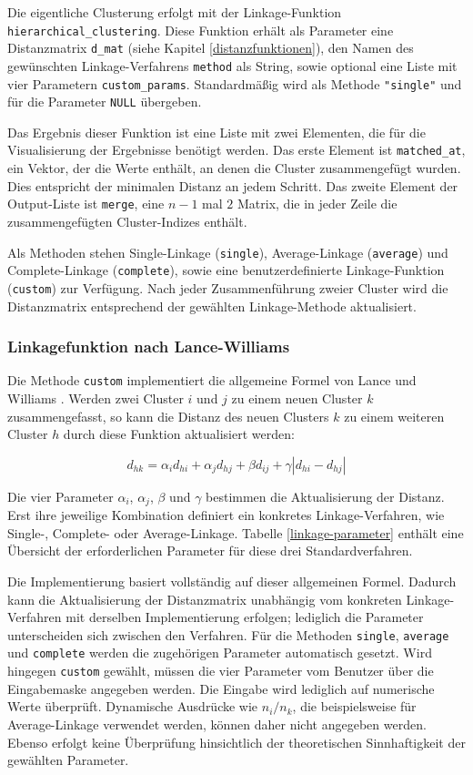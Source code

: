 \documentclass[12pt]{article}
\begin{document}
Die eigentliche Clusterung erfolgt mit der Linkage-Funktion \verb*|hierarchical_clustering|. Diese Funktion erhält als Parameter eine Distanzmatrix \verb*|d_mat| (siehe Kapitel \ref{distanzfunktionen}), den Namen des gewünschten Linkage-Verfahrens \verb*|method| als String, sowie optional eine Liste mit vier Parametern \verb*|custom_params|. Standardmäßig wird als Methode \verb*|"single"| und für die Parameter \verb*|NULL| übergeben.

Das Ergebnis dieser Funktion ist eine Liste mit zwei Elementen, die für die Visualisierung der Ergebnisse benötigt werden. Das erste Element ist \verb*|matched_at|, ein Vektor, der die Werte enthält, an denen die Cluster zusammengefügt wurden. Dies entspricht der minimalen Distanz an jedem Schritt. Das zweite Element der Output-Liste ist \verb*|merge|, eine $n-1$ mal $2$ Matrix, die in jeder Zeile die zusammengefügten Cluster-Indizes enthält.

Als Methoden stehen Single-Linkage (\verb*|single|), Average-Linkage (\verb*|average|) und Complete-Linkage (\verb*|complete|), sowie eine benutzerdefinierte Linkage-Funktion (\verb*|custom|) zur Verfügung. Nach jeder Zusammenführung zweier Cluster wird die Distanzmatrix entsprechend der gewählten Linkage-Methode aktualisiert.

\subsubsection{Linkagefunktion nach Lance-Williams}
\label{lance-williams}
Die Methode \verb*|custom| implementiert die allgemeine Formel von Lance und Williams \cite{Lance1967}. Werden zwei Cluster $i$ und $j$ zu einem neuen Cluster $k$ zusammengefasst, so kann die Distanz des neuen Clusters $k$ zu einem weiteren Cluster $h$ durch diese Funktion aktualisiert werden:

\[ d_{hk} = \alpha_i d_{hi} + \alpha_j d_{hj} + \beta d_{ij} + \gamma |d_{hi}-d_{hj}| \]

Die vier Parameter \(\alpha_i\), \(\alpha_j\), \(\beta\) und \(\gamma\) bestimmen die Aktualisierung der Distanz. Erst ihre jeweilige Kombination definiert ein konkretes Linkage-Verfahren, wie Single-, Complete- oder Average-Linkage. Tabelle \ref{linkage-parameter} enthält eine Übersicht der erforderlichen Parameter für diese drei Standardverfahren.

Die Implementierung basiert vollständig auf dieser allgemeinen Formel. Dadurch kann die Aktualisierung der Distanzmatrix unabhängig vom konkreten Linkage-Verfahren mit derselben Implementierung erfolgen; lediglich die Parameter unterscheiden sich zwischen den Verfahren. Für die Methoden \verb*|single|,  \verb*|average| und \verb*|complete| werden die zugehörigen Parameter automatisch gesetzt. Wird hingegen \verb*|custom| gewählt, müssen die vier Parameter vom Benutzer über die Eingabemaske angegeben werden. Die Eingabe wird lediglich auf numerische Werte überprüft. Dynamische Ausdrücke wie $n_i/n_k$, die beispielsweise für Average-Linkage verwendet werden, können daher nicht angegeben werden. Ebenso erfolgt keine Überprüfung hinsichtlich der theoretischen Sinnhaftigkeit der gewählten Parameter.
\end{document}

